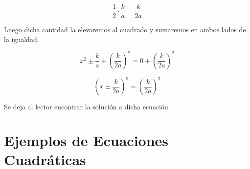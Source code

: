 \documentclass[letterpaper, 10pt, oneside]{book}
\begin{document}
	$$\frac{1}{2}\cdot \frac{k}{a} = \frac{k}{2a}$$
	
	Luego dicha cantidad la elevaremos al cuadrado y sumaremos en ambos lados de la igualdad.\newline
	
	$$x^2 \pm \frac{k}{a} + \left(\frac{k}{2a}\right)^2 = 0 + \left(\frac{k}{2a}\right)^2$$
	
	$$\left(x \pm \frac{k}{2a}\right)^2=\left(\frac{k}{2a}\right)^2$$\newline
	
	Se deja al lector encontrar la solución a dicha ecuación.
	
	\section{Ejemplos de Ecuaciones Cuadráticas}
	
\end{document}
